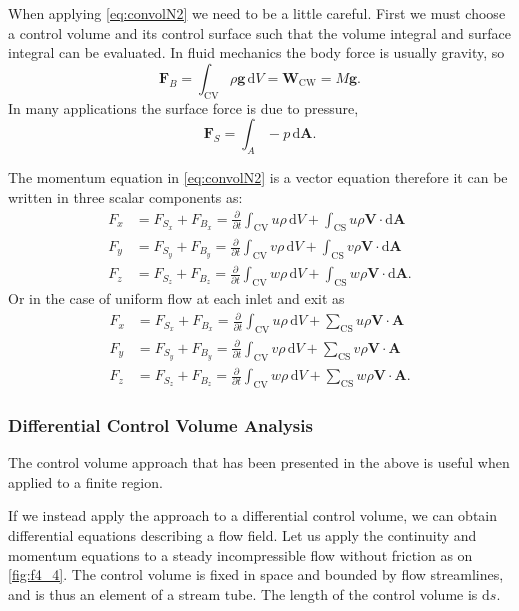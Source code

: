 When applying \autoref{eq:convolN2} we need to be a little careful. First we must choose a control volume and its control surface such that the volume integral and surface integral can be evaluated. In fluid mechanics the body force is usually gravity, so
\[ 
\textbf{F}_B = \int_{\mathrm{CV}} \rho \textbf{g} \, \mathrm{d}V = \textbf{W}_{\mathrm{CW}} = M \textbf{g}
.\]
In many applications the surface force is due to pressure,
\[ 
\textbf{F}_S = \int_A - p \, \mathrm{d}\textbf{A}
.\]

The momentum equation in \autoref{eq:convolN2} is a vector equation therefore it can be written in three scalar components as:
\begin{align*}
  F_x &= F_{S_x} + F_{B_x} = \frac{\partial }{\partial t} \int_{\mathrm{CV}} u \rho \, \mathrm{d}V + \int_{\mathrm{CS}} u \rho \textbf{V} \cdot \mathrm{d}\textbf{A} \\
    F_y &= F_{S_y} + F_{B_y} = \frac{\partial }{\partial t} \int_{\mathrm{CV}} v \rho \, \mathrm{d}V + \int_{\mathrm{CS}} v \rho \textbf{V} \cdot \mathrm{d}\textbf{A} \\
  F_z &= F_{S_z} + F_{B_z} = \frac{\partial }{\partial t} \int_{\mathrm{CV}} w \rho \, \mathrm{d}V + \int_{\mathrm{CS}} w \rho \textbf{V} \cdot \mathrm{d}\textbf{A}
.\end{align*}
Or in the case of uniform flow at each inlet and exit as
\begin{align*}
  F_x &= F_{S_x} + F_{B_x} = \frac{\partial }{\partial t}\int_{\mathrm{CV}} u \rho \, \mathrm{d}V + \sum_{\mathrm{CS}} u \rho \textbf{V} \cdot \textbf{A} \\
    F_y &= F_{S_y} + F_{B_y} = \frac{\partial }{\partial t}\int_{\mathrm{CV}} v \rho \, \mathrm{d}V + \sum_{\mathrm{CS}} v \rho \textbf{V} \cdot \textbf{A} \\
  F_z &= F_{S_z} + F_{B_z} = \frac{\partial }{\partial t}\int_{\mathrm{CV}} w \rho \, \mathrm{d}V + \sum_{\mathrm{CS}} w \rho \textbf{V} \cdot \textbf{A}
.\end{align*}

\subsubsection{Differential Control Volume Analysis}
The control volume approach that has been presented in the above is useful when applied to a finite region.

If we instead apply the approach to a differential control volume, we can obtain differential equations describing a flow field. Let us apply the continuity and momentum equations to a steady incompressible flow without friction as on \autoref{fig:f4_4}. The control volume is fixed in space and bounded by flow streamlines, and is thus an element of a stream tube. The length of the control volume is $\mathrm{d}s$. 

